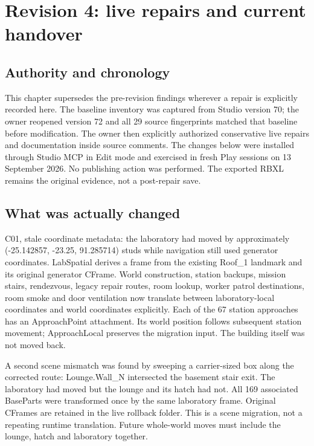 \chapter{Revision 4: live repairs and current handover}
\section{Authority and chronology}
This chapter supersedes the pre-revision findings wherever a repair is explicitly recorded here.\allowbreak{} The baseline inventory was captured from Studio version 70; the owner reopened version 72 and all 29 source fingerprints matched that baseline before modification.\allowbreak{} The owner then explicitly authorized conservative live repairs and documentation inside source comments.\allowbreak{} The changes below were installed through Studio MCP in Edit mode and exercised in fresh Play sessions on 13 September 2026.\allowbreak{} No publishing action was performed.\allowbreak{} The exported RBXL remains the original evidence, not a post-repair save.\allowbreak{}

\section{What was actually changed}
C01, stale coordinate metadata: the laboratory had moved by approximately (-25.\allowbreak{}142857, -23.\allowbreak{}25, 91.\allowbreak{}285714) studs while navigation still used generator coordinates.\allowbreak{} LabSpatial derives a frame from the existing Roof\_\allowbreak{}1 landmark and its original generator CFrame.\allowbreak{} World construction, station backups, mission stairs, rendezvous, legacy repair routes, room lookup, worker patrol destinations, room smoke and door ventilation now translate between laboratory-local coordinates and world coordinates explicitly.\allowbreak{} Each of the 67 station approaches has an ApproachPoint attachment.\allowbreak{} Its world position follows subsequent station movement; ApproachLocal preserves the migration input.\allowbreak{} The building itself was not moved back.\allowbreak{}

A second scene mismatch was found by sweeping a carrier-sized box along the corrected route: Lounge.\allowbreak{}Wall\_\allowbreak{}N intersected the basement stair exit.\allowbreak{} The laboratory had moved but the lounge and its hatch had not.\allowbreak{} All 169 associated BaseParts were transformed once by the same laboratory frame.\allowbreak{} Original CFrames are retained in the live rollback folder.\allowbreak{} This is a scene migration, not a repeating runtime translation.\allowbreak{} Future whole-world moves must include the lounge, hatch and laboratory together.\allowbreak{}


